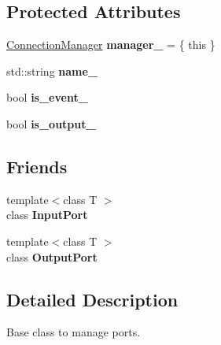 \subsection*{Protected Attributes}
\begin{DoxyCompactItemize}
\item 
\hypertarget{classcoco_1_1_port_base_a33f04beb590390a25bfdcf300bffb70e}{\hyperlink{classcoco_1_1_connection_manager}{Connection\-Manager} {\bfseries manager\-\_\-} = \{ this \}}\label{classcoco_1_1_port_base_a33f04beb590390a25bfdcf300bffb70e}

\item 
\hypertarget{classcoco_1_1_port_base_a3ca4d9d5dcd73da483b176fdd45cb837}{std\-::string {\bfseries name\-\_\-}}\label{classcoco_1_1_port_base_a3ca4d9d5dcd73da483b176fdd45cb837}

\item 
\hypertarget{classcoco_1_1_port_base_a3bda6ce2261f36704a7f30dfed297426}{bool {\bfseries is\-\_\-event\-\_\-}}\label{classcoco_1_1_port_base_a3bda6ce2261f36704a7f30dfed297426}

\item 
\hypertarget{classcoco_1_1_port_base_a6119b0d7b6bb1eabf085afb7f3bc149f}{bool {\bfseries is\-\_\-output\-\_\-}}\label{classcoco_1_1_port_base_a6119b0d7b6bb1eabf085afb7f3bc149f}

\end{DoxyCompactItemize}
\subsection*{Friends}
\begin{DoxyCompactItemize}
\item 
\hypertarget{classcoco_1_1_port_base_aa750daec74c1bf813c092ea268f3b8f8}{{\footnotesize template$<$class T $>$ }\\class {\bfseries Input\-Port}}\label{classcoco_1_1_port_base_aa750daec74c1bf813c092ea268f3b8f8}

\item 
\hypertarget{classcoco_1_1_port_base_a1b667fb33da7060c4747eeafcd85db20}{{\footnotesize template$<$class T $>$ }\\class {\bfseries Output\-Port}}\label{classcoco_1_1_port_base_a1b667fb33da7060c4747eeafcd85db20}

\end{DoxyCompactItemize}


\subsection{Detailed Description}
Base class to manage ports. 

